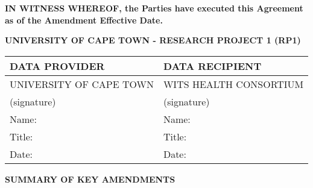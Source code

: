 \documentclass[12pt,letterpaper]{article}
\newcommand{\added}[1]{\textcolor{addcolor}{#1}}
\begin{document}
\vspace{0.5cm}

\textbf{IN WITNESS WHEREOF, the Parties have executed this Agreement as of the \added{Amendment} Effective Date.}

\begin{center}
\textbf{UNIVERSITY OF CAPE TOWN - RESEARCH PROJECT 1 (RP1)}
\end{center}

\begin{tabular}{|p{}|p{}|}
\hline
\textbf{DATA PROVIDER} & \textbf{DATA RECIPIENT} \\
\hline
UNIVERSITY OF CAPE TOWN & WITS HEALTH CONSORTIUM \\
\hline
(signature) & (signature) \\
\hline
Name: & Name: \\
\hline
Title: & Title: \\
\hline
Date: & Date: \\
\hline
\end{tabular}

\vspace{1cm}

\begin{center}
\textbf{\Large SUMMARY OF KEY AMENDMENTS}
\end{center}
\end{document}
